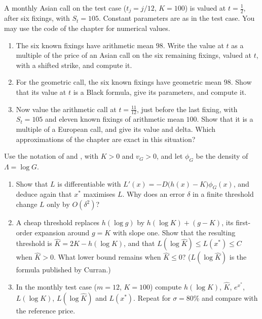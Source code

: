 \begin{exercise}\label{ex:as-seasoned}
\medium A monthly Asian call on the test case ($t_j=j/12$, $K=100$) is valued at $t=\frac12$,
after six fixings, with $S_t=105$. Constant parameters are as in the test case. You may use the
code of the chapter for numerical values.
\begin{enumerate}[label=(\alph*)]
  \item The six known fixings have arithmetic mean $98$. Write the value at $t$ as a multiple of
    the price of an Asian call on the six remaining fixings, valued at $t$, with a shifted strike,
    and compute it.
  \item For the geometric call, the six known fixings have geometric mean $98$. Show that its value
    at $t$ is a Black formula, give its parameters, and compute it.
  \item Now value the arithmetic call at $t=\frac{11}{12}$, just before the last fixing, with
    $S_t=105$ and eleven known fixings of arithmetic mean $100$. Show that it is a multiple of a
    European call, and give its value and delta. Which approximations of the chapter are exact
    in this situation?
\end{enumerate}
\end{exercise}

\begin{exercise}[Thresholds]\label{ex:as-threshold}
\medium Use the notation of  and , with
$K>0$ and $v_G>0$, and let $\phi_G$ be the density of $\Lambda=\log G$.
\begin{enumerate}[label=(\alph*)]
  \item Show that $L$ is differentiable with $L'(x)=-D\big(h(x)-K\big)\phi_G(x)$, and deduce
    again that $x^*$ maximises $L$. Why does an error $\delta$ in a finite threshold change $L$
    only by $O(\delta^2)$?
  \item A cheap threshold replaces $h(\log g)$ by $h(\log K)+(g-K)$, its first-order expansion
    around $g=K$ with slope one. Show that the resulting threshold is
    $\hat K=2K-h(\log K)$, and that $L(\log\hat K)\le L(x^*)\le C$ when $\hat K>0$. What lower
    bound remains when $\hat K\le0$? ($L(\log\hat K)$ is the formula published by Curran.)
  \item In the monthly test case ($m=12$, $K=100$) compute $h(\log K)$, $\hat K$, $e^{x^*}$,
    $L(\log K)$, $L(\log\hat K)$ and $L(x^*)$. Repeat for $\sigma=80\%$ and compare with the
    reference price.
\end{enumerate}
\end{exercise}

